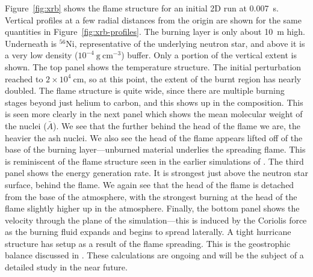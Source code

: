 \documentclass[a4paper]{jpconf}
\newcommand{\isot}[2]{$^{#2}\mathrm{#1}$}
\newcommand{\gcc}{\mathrm{g~cm^{-3} }}
\begin{document}
Figure~\ref{fig:xrb} shows the flame structure for an initial 2D run
at 0.007~s.  Vertical profiles at a few radial distances from the
origin are shown for the same quantities in
Figure~\ref{fig:xrb-profiles}.  The burning layer is only about 10~m
high.  Underneath is \isot{Ni}{56}, representative of the underlying
neutron star, and above it is a very low density ($10^{-4}~\gcc$)
buffer.  Only a portion of the vertical extent is shown.  The top
panel shows the temperature structure.  The initial perturbation
reached to $2\times 10^4~\mathrm{cm}$, so at this point, the extent of
the burnt region has nearly doubled.  The flame structure is quite
wide, since there are multiple burning stages beyond just helium to
carbon, and this shows up in the composition.  This is seen more
clearly in the next panel which shows the mean molecular weight of the
nuclei ($\bar{A}$).  We see that the further behind the head of the
flame we are, the heavier the ash nuclei.  We also see the head of the
flame appears lifted off of the base of the burning layer---unburned
material underlies the spreading flame.  This is reminiscent of the
flame structure seen in the earlier simulations of
\cite{cavecchi:2012}.  The third panel shows the energy generation
rate.  It is strongest just above the neutron star surface, behind the
flame.  We again see that the head of the flame is detached from the
base of the atmosphere, with the strongest burning at the head of the
flame slightly higher up in the atmosphere.  Finally, the bottom panel
shows the velocity through the plane of the simulation---this is
induced by the Coriolis force as the burning fluid expands and begins
to spread laterally.  A tight hurricane structure has setup as a
result of the flame spreading.  This is the geostrophic balance
discussed in \cite{SPIT_ETAL02}.  These calculations are ongoing and
will be the subject of a detailed study in the near future.
\end{document}
